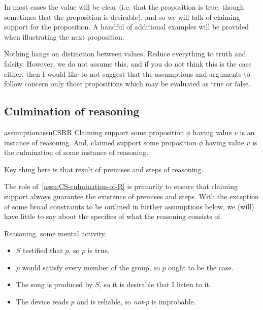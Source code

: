 \begin{note}
In most cases the value will be clear (i.e. that the proposition is true, though sometimes that the proposition is desirable), and so we will talk of claiming support for the proposition.
  A handful of additional examples will be provided when illustrating the next proposition.
\end{note}

\begin{note}
  Nothing hangs on distinction between values.
  Reduce everything to truth and falsity.
  However, we do not assume this, and if you do not think this is the case either, then I would like to not suggest that the assumptions and arguments to follow concern only those propositions which may be evaluated as true or false.
\end{note}


\subsection{Culmination of reasoning}
\label{sec:basic-assumptions:culmination-of-reasoning}

\begin{note}
  \begin{restatable}{assumption}{assuCSRR}
    \label{assu:CS-culmination-of-R}
    Claiming support some proposition \(\phi\) having value \(v\) is an instance of reasoning.
    And, claimed support some proposition \(\phi\) having value \(v\) is the culmination of some instance of reasoning.
  \end{restatable}
\end{note}

\begin{note}
  Key thing here is that result of premises and steps of reasoning.

  The role of~\autoref{assu:CS-culmination-of-R} is primarily to ensure that claiming support always guarantee the existence of premises and steps.
  With the exception of some broad constraints to be outlined in further assumptions below, we (will) have little to say about the specifics of what the reasoning consists of.
\end{note}

\begin{note}
  Reasoning, some mental activity.
\end{note}

\begin{note}
  \begin{itemize}
  \item \(S\) testified that \(p\), so \(p\) is true.
  \item \(p\) would satisfy every member of the group, so \(p\) ought to be the case.
  \item The song is produced by \(S\), so it is desirable that I listen to it.
  \item The device reads \(p\) and is reliable, so \emph{not}-\(p\) is improbable.
  \end{itemize}
\end{note}

